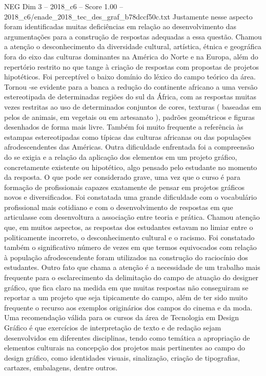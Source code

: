 \begin{textsample}{NEG Dim 3 – 2018\_c6 – Score 1.00 – 2018\_c6/enade\_2018\_tec\_des\_graf\_b78dccf50c.txt}
Justamente nesse aspecto foram identificadas muitas deficiências em relação ao desenvolvimento das argumentações para a construção de respostas adequadas a essa questão.
Chamou a atenção o desconhecimento da diversidade cultural, artística, étnica e geográfica fora do eixo das culturas dominantes na América do Norte e na Europa, além do repertório restrito no que tange à criação de respostas com propostas de projetos hipotéticos.
Foi perceptível o baixo domínio do léxico do campo teórico da área.
Tornou -se evidente para a banca a redução do continente africano a uma versão estereotipada de determinadas regiões do sul da África, com as respostas muitas vezes restritas ao uso de determinados conjuntos de cores, texturas ( baseadas em pelos de animais, em vegetais ou em artesanato ), padrões geométricos e figuras desenhados de forma mais livre.
Também foi muito frequente a referência às estampas estereotipadas como típicas das culturas africanas ou das populações afrodescendentes das Américas.
Outra dificuldade enfrentada foi a compreensão do se exigia e a relação da aplicação dos elementos em um projeto gráfico, concretamente existente ou hipotético, algo pensado pelo estudante no momento da resposta.
O que pode ser considerado grave, uma vez que o curso é para formação de profissionais capazes exatamente de pensar em projetos gráficos novos e diversificados.
Foi constatada uma grande dificuldade com o vocabulário profissional mais cotidiano e com o desenvolvimento de respostas em que articulasse com desenvoltura a associação entre teoria e prática.
Chamou atenção que, em muitos aspectos, as respostas dos estudantes estavam no limiar entre o politicamente incorreto, o desconhecimento cultural e o racismo.
Foi constatado também o significativo número de vezes em que termos equivocados com relação à população afrodescendente foram utilizados na construção do raciocínio dos estudantes.
Outro fato que chama a atenção é a necessidade de um trabalho mais frequente para o esclarecimento da delimitação do campo de atuação do designer gráfico, que fica claro na medida em que muitas respostas não conseguiram se reportar a um projeto que seja tipicamente do campo, além de ter sido muito frequente o recurso aos exemplos originários dos campos do cinema e da moda.
Uma recomendação válida para os cursos da área de Tecnologia em Design Gráfico é que exercícios de interpretação de texto e de redação sejam desenvolvidos em diferentes disciplinas, tendo como temática a apropriação de elementos culturais na concepção dos projetos mais pertinentes ao campo do design gráfico, como identidades visuais, sinalização, criação de tipografias, cartazes, embalagens, dentre outros.

\end{textsample}
